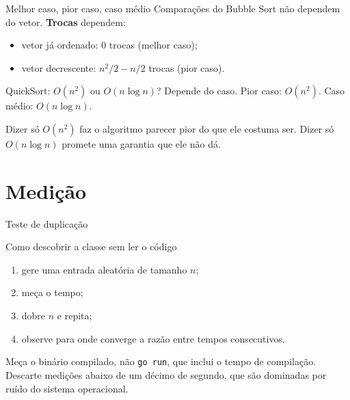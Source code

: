 \documentclass{beamer}
\newcommand{\tcg}[1]{\textcolor{green!50!black}{#1}}
\begin{document}
\begin{frame}{Melhor caso, pior caso, caso médio}
	Comparações do Bubble Sort não dependem do vetor. \textbf{Trocas} dependem:

	\begin{itemize}
		\item vetor já ordenado: \tcg{0} trocas (melhor caso);
		\item vetor decrescente: $n^2/2-n/2$ trocas (pior caso).
	\end{itemize}

	\vspace{0.4cm}
	\begin{alertblock}{QuickSort: $O(n^2)$ ou $O(n \log n)$?}
		Depende do caso. Pior caso: $O(n^2)$. Caso médio: $O(n \log n)$.

		\vspace{0.15cm}
		Dizer só $O(n^2)$ faz o algoritmo parecer pior do que ele costuma ser.
		Dizer só $O(n \log n)$ promete uma garantia que ele não dá.
	\end{alertblock}
\end{frame}

\section{Medição}

\begin{frame}{Teste de duplicação}
	\begin{block}{Como descobrir a classe sem ler o código}
		\begin{enumerate}
			\item gere uma entrada aleatória de tamanho $n$;
			\item meça o tempo;
			\item dobre $n$ e repita;
			\item observe para onde converge a razão entre tempos consecutivos.
		\end{enumerate}
	\end{block}

	\vspace{0.3cm}
	\footnotesize Meça o binário compilado, não \texttt{go run}, que inclui o
	tempo de compilação. Descarte medições abaixo de um décimo de segundo, que
	são dominadas por ruído do sistema operacional.
\end{frame}
\end{document}
